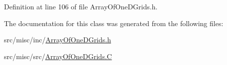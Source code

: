 Definition at line 106 of file Array\-Of\-One\-D\-Grids.\-h.



The documentation for this class was generated from the following files\-:\begin{DoxyCompactItemize}
\item 
src/misc/inc/\hyperlink{_array_of_one_d_grids_8h}{Array\-Of\-One\-D\-Grids.\-h}\item 
src/misc/src/\hyperlink{_array_of_one_d_grids_8_c}{Array\-Of\-One\-D\-Grids.\-C}\end{DoxyCompactItemize}
